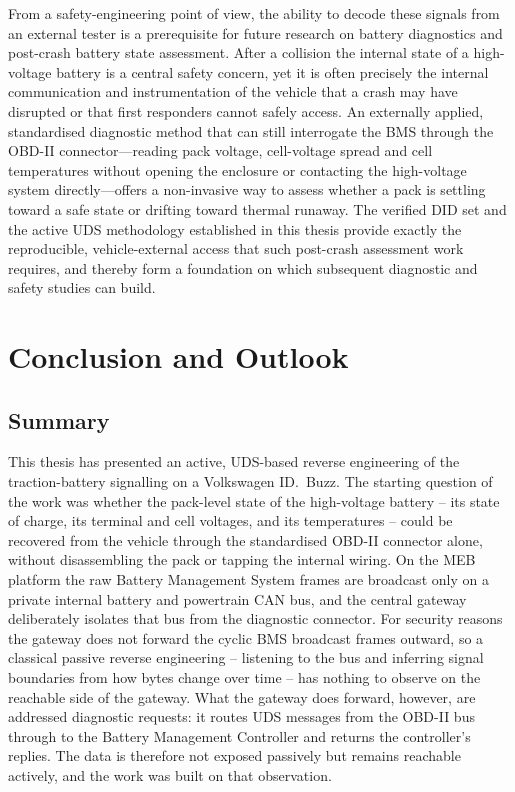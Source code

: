 \documentclass[11pt,a4paper,oneside,parskip=half]{scrreprt}
\begin{document}
From a safety-engineering point of view, the ability to decode these signals from an external tester is a prerequisite for future research on battery diagnostics and post-crash battery state assessment. After a collision the internal state of a high-voltage battery is a central safety concern, yet it is often precisely the internal communication and instrumentation of the vehicle that a crash may have disrupted or that first responders cannot safely access. An externally applied, standardised diagnostic method that can still interrogate the BMS through the OBD-II connector---reading pack voltage, cell-voltage spread and cell temperatures without opening the enclosure or contacting the high-voltage system directly---offers a non-invasive way to assess whether a pack is settling toward a safe state or drifting toward thermal runaway. The verified DID set and the active UDS methodology established in this thesis provide exactly the reproducible, vehicle-external access that such post-crash assessment work requires, and thereby form a foundation on which subsequent diagnostic and safety studies can build.


\chapter{Conclusion and Outlook}
\section{Summary}
This thesis has presented an active, UDS-based reverse engineering of the traction-battery signalling on a Volkswagen ID.~Buzz. The starting question of the work was whether the pack-level state of the high-voltage battery -- its state of charge, its terminal and cell voltages, and its temperatures -- could be recovered from the vehicle through the standardised OBD-II connector alone, without disassembling the pack or tapping the internal wiring. On the MEB platform the raw Battery Management System frames are broadcast only on a private internal battery and powertrain CAN bus, and the central gateway deliberately isolates that bus from the diagnostic connector. For security reasons the gateway does not forward the cyclic BMS broadcast frames outward, so a classical passive reverse engineering -- listening to the bus and inferring signal boundaries from how bytes change over time -- has nothing to observe on the reachable side of the gateway. What the gateway does forward, however, are addressed diagnostic requests: it routes UDS messages from the OBD-II bus through to the Battery Management Controller and returns the controller's replies. The data is therefore not exposed passively but remains reachable actively, and the work was built on that observation.
\end{document}
